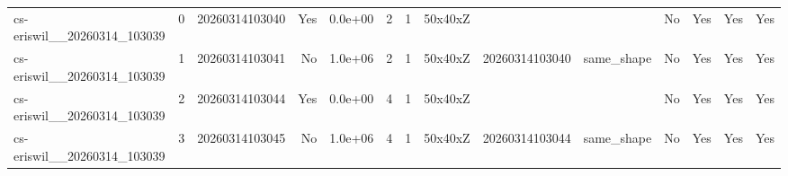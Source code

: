 \begin{table}[t]
{\begin{tabular}{lrrrcccclccccc}
cs-eriswil\_\_20260314\_103039 & 0 & 20260314103040 & Yes & 0.0e+00 & 2 & 1 & 50x40xZ &  &  & No & Yes & Yes & Yes \\
cs-eriswil\_\_20260314\_103039 & 1 & 20260314103041 & No & 1.0e+06 & 2 & 1 & 50x40xZ & 20260314103040 & same\_shape & No & Yes & Yes & Yes \\
cs-eriswil\_\_20260314\_103039 & 2 & 20260314103044 & Yes & 0.0e+00 & 4 & 1 & 50x40xZ &  &  & No & Yes & Yes & Yes \\
cs-eriswil\_\_20260314\_103039 & 3 & 20260314103045 & No & 1.0e+06 & 4 & 1 & 50x40xZ & 20260314103044 & same\_shape & No & Yes & Yes & Yes \\
\hline
\end{tabular}
}
\end{table}
